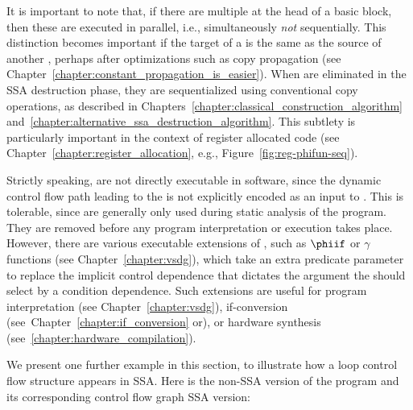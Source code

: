 It is important to note that, if there are multiple \phifuns{}
at the head of a basic block, then these are executed in parallel, 
i.e., simultaneously \textit{not} sequentially.
This distinction becomes important if the target of a \phifun
is the same as the source of another \phifun, perhaps after
optimizations such as copy propagation
(see Chapter~\ref{chapter:constant_propagation_is_easier}).
When \phifuns are eliminated in the SSA destruction phase,
they are sequentialized using conventional 
copy operations,
as described in Chapters~\ref{chapter:classical_construction_algorithm} and~\ref{chapter:alternative_ssa_destruction_algorithm}. This subtlety is particularly important in the context of register allocated code (see Chapter~\ref{chapter:register_allocation}, e.g., Figure~\ref{fig:reg-phifun-seq}).



Strictly speaking, \phifuns are not directly executable in software,
since the dynamic control flow path leading to the \phifun
is not explicitly encoded as an input to \phifun.
This is tolerable, since \phifuns are generally only 
used during static analysis of the program. They are removed
before any program interpretation or execution takes place.
However, there are various executable extensions of \phifuns, 
such as $\phiif$ or $\gamma$ functions (see Chapter~\ref{chapter:vsdg}), which take
an extra predicate parameter to replace the implicit
control dependence that dictates the argument the \phifun should select by a condition dependence. Such extensions are useful for program interpretation (see Chapter~\ref{chapter:vsdg}), if-conversion (see~Chapter~\ref{chapter:if_conversion} or), or hardware synthesis (see~\ref{chapter:hardware_compilation}).



We present one further example in this section,
to illustrate how a loop control flow structure appears in SSA.
Here is the non-SSA version of the program and its corresponding control flow graph SSA version:
\medskip

